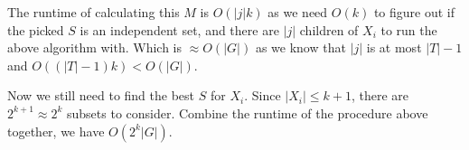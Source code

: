\documentclass[11pt]{article}
\begin{document}
The runtime of calculating this $M$ is $O(|j|k)$ as we need $O(k)$ to figure out if the picked $S$ is an independent set, and there are $|j|$ children of $X_i$ to run the above algorithm with. Which is $\approx O(|G|)$ as we know that $|j|$ is at most $|T| - 1$ and $O((|T| - 1) k) < O(|G|)$.\newline

Now we still need to find the best $S$ for $X_i$. Since $|X_i| \leq k + 1$, there are $2^{k+1} \approx 2^k$ subsets to consider. Combine the runtime of the procedure above together, we have $O(2^k|G|)$.
\end{document}
